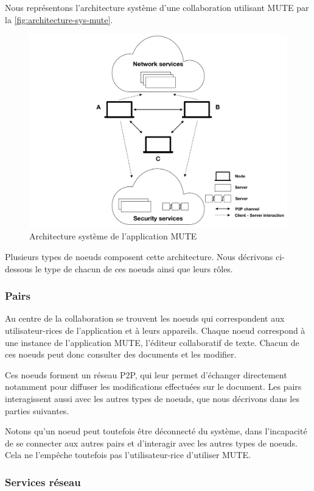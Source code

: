 Nous représentons l'architecture système d'une collaboration utilisant MUTE par la \autoref{fig:architecture-sys-mute}.

\begin{figure}[!ht]
  \centering
  \includegraphics[page=1, trim=0cm 0cm 0cm 0cm, clip, width=.7\linewidth]{img/mute-figures.pdf}
  \caption{Architecture système de l'application MUTE}
  \label{fig:architecture-sys-mute}
\end{figure}

Plusieurs types de noeuds composent cette architecture.
Nous décrivons ci-dessous le type de chacun de ces noeuds ainsi que leurs rôles.

\subsubsection{Pairs}

Au centre de la collaboration se trouvent les noeuds qui correspondent aux utilisateur-rices de l'application et à leurs appareils.
Chaque noeud correspond à une instance de l'application \ac{MUTE}, \ie l'éditeur collaboratif de texte.
Chacun de ces noeuds peut donc consulter des documents et les modifier.

Ces noeuds forment un réseau \ac{P2P}, qui leur permet d'échanger directement notamment pour diffuser les modifications effectuées sur le document.
Les pairs interagissent aussi avec les autres types de noeuds, que nous décrivons dans les parties suivantes.

Notons qu'un noeud peut toutefois être déconnecté du système, \ie dans l'incapacité de se connecter aux autres pairs et d'interagir avec les autres types de noeuds.
Cela ne l'empêche toutefois pas l'utilisateur-rice d'utiliser \ac{MUTE}.

\subsubsection{Services réseau}


